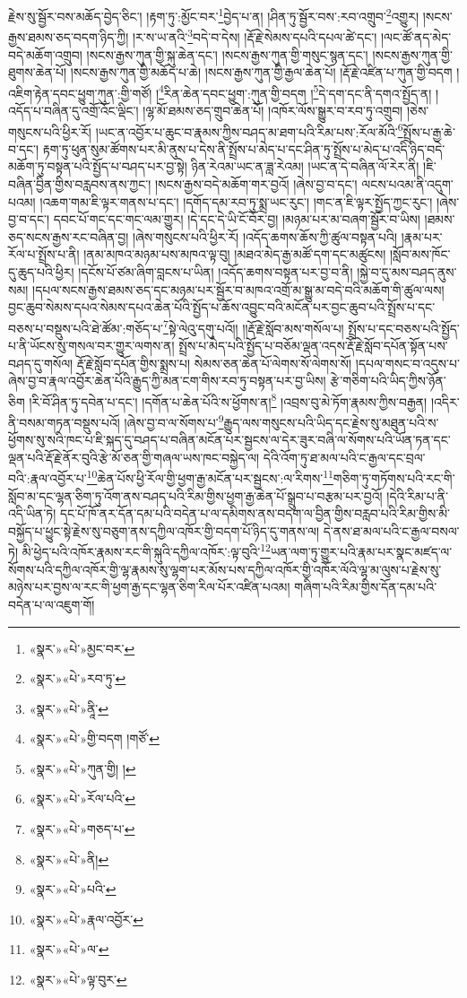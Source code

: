 རྗེས་སུ་སྦྱོར་བས་མཆོད་བྱེད་ཅིང་། །རྟག་ཏུ་:མྱོང་བར་\footnote{«སྣར་»«པེ་»མྱང་བར་}བྱེད་པ་ན། །ཤིན་ཏུ་སྦྱོར་བས་:རབ་འགྲུབ་\footnote{«སྣར་»«པེ་»རབ་ཏུ་}འགྱུར། །སངས་རྒྱས་ཐམས་ཅད་བདག་ཉིད་ཀྱི། །ར་ས་ཡ་ནའི་\footnote{«སྣར་»«པེ་»ནཱི་}བདེ་བ་དེས། །རྡོ་རྗེ་སེམས་དཔའི་དཔལ་ཚེ་དང་། །ལང་ཚོ་ནད་མེད་བདེ་མཆོག་འགྲུབ། །སངས་རྒྱས་ཀུན་གྱི་སྐུ་ཆེན་དང་། །སངས་རྒྱས་ཀུན་གྱི་གསུང་སྙན་དང་། །སངས་རྒྱས་ཀུན་གྱི་ཐུགས་ཆེན་པོ། །སངས་རྒྱས་ཀུན་གྱི་མཆོད་པ་ཆེ། །སངས་རྒྱས་ཀུན་གྱི་རྒྱལ་ཆེན་པོ། །རྡོ་རྗེ་འཛིན་པ་ཀུན་གྱི་བདག །འཇིག་རྟེན་དབང་ཕྱུག་ཀུན་:གྱི་གཙོ། །\footnote{«སྣར་»«པེ་»གྱི་བདག །གཙོ་}རིན་ཆེན་དབང་ཕྱུག་:ཀུན་གྱི་བདག །\footnote{«སྣར་»«པེ་»ཀུན་གྱི། །}དེ་དག་དང་ནི་དགའ་སྤྱོད་ན། །འདོད་པ་བཞིན་དུ་འགྲོ་འོང་ལྡིང་། །ལྷ་མོ་ཐམས་ཅད་གྲུབ་ཆེན་པོ། །འཁོར་ལོས་སྒྱུར་བ་རབ་ཏུ་འགྲུབ། །ཅེས་གསུངས་པའི་ཕྱིར་རོ། །ཡང་ན་འབྱོར་པ་ཆུང་བ་རྣམས་ཀྱིས་བཤད་མ་ཐག་པའི་རིམ་པས་:རོལ་མོའི་\footnote{«སྣར་»«པེ་»རོལ་པའི་}སྤྲོས་པ་རྒྱ་ཆེ་བ་དང་། རྟག་ཏུ་ཕུན་སུམ་ཚོགས་པར་མི་ནུས་པ་དེས་ནི་སྤྲོས་པ་མེད་པ་དང་ཤིན་ཏུ་སྤྲོས་པ་མེད་པ་འདི་ཉིད་བདེ་མཆོག་ཏུ་བསྟན་པའི་སྤྱོད་པ་བཤད་པར་བྱ་སྟེ། ཉིན་རེའམ་ཡང་ན་ཟླ་རེའམ། །ཡང་ན་དེ་བཞིན་ལོ་རེར་ནི། །ཇི་བཞིན་བྱིན་གྱིས་བརླབས་ནས་ཀྱང་། །སངས་རྒྱས་བདེ་མཆོག་གར་བྱའོ། །ཞེས་བྱ་བ་དང་། ལངས་པའམ་ནི་འདུག་པའམ། །འཆག་གམ་ཇི་ལྟར་གནས་པ་དང་། །དགོད་དམ་རབ་ཏུ་སྨྲ་ཡང་རུང་། །གང་ན་ཇི་ལྟར་སྤྱོད་ཀྱང་རུང་། །ཞེས་བྱ་བ་དང་། དབང་པོ་གང་དང་གང་ལམ་གྱུར། །དེ་དང་དེ་ཡི་ངོ་བོར་བྱ། །མཉམ་པར་མ་བཞག་སྦྱོར་བ་ཡིས། །ཐམས་ཅད་སངས་རྒྱས་རང་བཞིན་བྱ། །ཞེས་གསུངས་པའི་ཕྱིར་རོ། །འདོད་ཆགས་ཆོས་ཀྱི་ཚུལ་བསྟན་པའི། །རྣམ་པར་རོལ་པ་སྤྲོས་པ་ནི། །ནམ་མཁའ་མཉམ་པས་མཁའ་ལྟ་བུ། །མཐའ་མེད་རྒྱ་མཚོ་དག་དང་མཚུངས། །སློབ་མས་ཁོང་དུ་ཆུད་པའི་ཕྱིར། །དངོས་པོ་ཙམ་ཞིག་བླངས་པ་ཡིན། །འདོད་ཆགས་བསྟན་པར་བྱ་བ་ནི། །སྐྱེ་བ་དུ་མས་བཤད་ནུས་སམ། །དཔལ་སངས་རྒྱས་ཐམས་ཅད་དང་མཉམ་པར་སྦྱོར་བ་མཁའ་འགྲོ་མ་སྒྱུ་མ་བདེ་བའི་མཆོག་གི་ཚུལ་ལས། བྱང་ཆུབ་སེམས་དཔའ་སེམས་དཔའ་ཆེན་པོའི་སྤྱོད་པ་ཆོས་འབྱུང་བའི་མངོན་པར་བྱང་ཆུབ་པའི་སྤྲོས་པ་དང་བཅས་པ་བསྡུས་པའི་ཐེ་ཚོམ་:གཅོད་པ་\footnote{«སྣར་»«པེ་»གཅད་པ་}སྟེ་ལེའུ་དགུ་པའོ།། །།རྡོ་རྗེ་སློབ་མས་གསོལ་པ། སྤྲོས་པ་དང་བཅས་པའི་སྤྱོད་པ་ནི་ཡོངས་སུ་གསལ་བར་གྱུར་ལགས་ན། སྤྲོས་པ་མེད་པའི་སྤྱོད་པ་བཅོམ་ལྡན་འདས་རྡོ་རྗེ་སློབ་དཔོན་སྟོན་པས་བཤད་དུ་གསོལ། རྡོ་རྗེ་སློབ་དཔོན་གྱིས་སྨྲས་པ། སེམས་ཅན་ཆེན་པོ་ལེགས་སོ་ལེགས་སོ། །དཔལ་གསང་བ་འདུས་པ་ཞེས་བྱ་བ་རྣལ་འབྱོར་ཆེན་པོའི་རྒྱུད་ཀྱི་མན་ངག་གིས་རབ་ཏུ་བསྟན་པར་བྱ་ཡིས། རྩེ་གཅིག་པའི་ཡིད་ཀྱིས་ཉོན་ཅིག །རི་བོ་ཤིན་ཏུ་དབེན་པ་དང་། །དགོན་པ་ཆེན་པོའི་ས་ཕྱོགས་ན།\footnote{«སྣར་»«པེ་»ནི།} །འབྲས་བུ་མེ་ཏོག་རྣམས་ཀྱིས་བརྒྱན། །འདིར་ནི་བསམ་གཏན་བསྡུས་པའོ། །ཞེས་བྱ་བ་ལ་སོགས་པ་\footnote{«སྣར་»«པེ་»པའི་}རྒྱུད་ལས་གསུངས་པའི་ཡིད་དང་རྗེས་སུ་མཐུན་པའི་ས་ཕྱོགས་སུ་སའི་ཁང་པ་ཇི་སྐད་དུ་བཤད་པ་བཞིན་མངོན་པར་སྦྱངས་ལ་དེར་ཟུར་བཞི་ལ་སོགས་པའི་ཡོན་ཏན་དང་ལྡན་པའི་རྡོ་རྗེ་ནོར་བུའི་རྩེ་མོ་ཅན་གྱི་གཞལ་ཡས་ཁང་བསྐྱེད་ལ། དེའི་འོག་ཏུ་ཐ་མལ་པའི་ང་རྒྱལ་དང་བྲལ་བའི་:རྣལ་འབྱོར་པ་\footnote{«སྣར་»«པེ་»རྣལ་འབྱོར་}ཆེན་པོས་ཕྱི་རོལ་གྱི་ཕྱག་རྒྱ་མངོན་པར་སྦྱངས་:ལ་རིགས་\footnote{«སྣར་»«པེ་»ལ་}གཅིག་ཏུ་གཏོགས་པའི་རང་གི་སློབ་མ་དང་ལྷན་ཅིག་ཏུ་འོག་ནས་བཤད་པའི་རིམ་གྱིས་ཕྱག་རྒྱ་ཆེན་པོ་སྒྲུབ་པ་བརྩམ་པར་བྱའོ། །དེའི་རིམ་པ་ནི་འདི་ཡིན་ཏེ། དང་པོ་ཁོ་ནར་དོན་དམ་པའི་བདེན་པ་ལ་དམིགས་ནས་བདག་ལ་བྱིན་གྱིས་བརླབ་པའི་རིམ་གྱིས་མི་བསྐྱོད་པ་ཕྱུང་སྟེ་རྗེས་སུ་བཅུག་ནས་དཀྱིལ་འཁོར་གྱི་བདག་པོ་ཉིད་དུ་གནས་ལ། དེ་ནས་ཐ་མལ་པའི་ང་རྒྱལ་བསལ་ཏེ། མི་ཕྱེད་པའི་འཁོར་རྣམས་རང་གི་སྐུའི་དཀྱིལ་འཁོར་:ལྟ་བུའི་\footnote{«སྣར་»«པེ་»ལྟ་བུར་}ཡན་ལག་ཏུ་གྱུར་པའི་རྣམ་པར་སྣང་མཛད་ལ་སོགས་པའི་དཀྱིལ་འཁོར་གྱི་ལྷ་རྣམས་སུ་ལྷག་པར་མོས་པས་དཀྱིལ་འཁོར་གྱི་འཁོར་ལོའི་ལྷ་མ་ལུས་པ་རྗེས་སུ་མཉེས་པར་བྱས་ལ་རང་གི་ཕྱག་རྒྱ་དང་ལྷན་ཅིག་རིལ་པོར་འཛིན་པའམ། གཞིག་པའི་རིམ་གྱིས་དོན་དམ་པའི་བདེན་པ་ལ་འཇུག་གོ། 